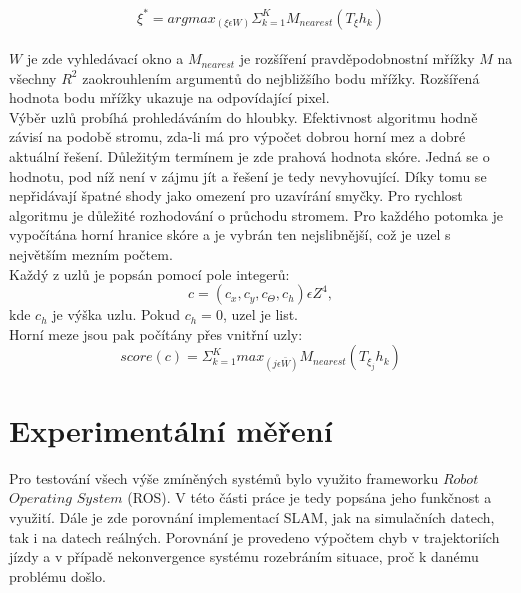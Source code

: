 \documentclass[12pt]{report}
\begin{document}
\begin{equation}
\xi^*=argmax_{(\xi\epsilon W)}\Sigma_{k=1}^KM_{nearest}(T_{\xi}h_k)
\end{equation}\\
$W$ je zde vyhledávací okno a $M_{nearest}$ je rozšíření pravděpodobnostní mřížky $M$ na všechny $R^2$ zaokrouhlením argumentů do nejbližšího bodu mřížky. Rozšířená hodnota bodu mřížky ukazuje na odpovídající pixel.\\
\indent Výběr uzlů probíhá prohledáváním do hloubky. Efektivnost algoritmu hodně závisí na podobě stromu, zda-li má pro výpočet dobrou horní mez a dobré aktuální řešení. Důležitým termínem je zde prahová hodnota skóre. Jedná se o hodnotu, pod níž není v zájmu jít a řešení je tedy nevyhovující. Díky tomu se nepřidávají špatné shody jako omezení pro uzavírání smyčky. Pro rychlost algoritmu je důležité rozhodování o průchodu stromem. Pro každého potomka je vypočítána horní hranice skóre a je vybrán ten nejslibnější, což je uzel s největším mezním počtem.\\
\indent Každý z uzlů je popsán pomocí pole integerů: 
\begin{equation}
c=(c_x,c_y,c_\Theta,c_h)\epsilon Z^4,
\end{equation}
kde $c_h$ je výška uzlu. Pokud $c_h=0$, uzel je list.\\
\indent Horní meze jsou pak počítány přes vnitřní uzly: 
\begin{equation}
score(c)=\Sigma_{k=1}^Kmax_{(j\epsilon \bar{W})}M_{nearest}(T_{\xi_j}h_k)
\end{equation}

\newpage

\chapter{Experimentální měření}
Pro testování všech výše zmíněných systémů bylo využito frameworku $Robot$ $Operating$ $System$ (ROS). V této části práce je tedy popsána jeho funkčnost a využití. Dále je zde porovnání implementací SLAM, jak na simulačních datech, tak i na datech reálných. Porovnání je provedeno výpočtem chyb v trajektoriích jízdy a v případě nekonvergence systému rozebráním situace, proč k danému problému došlo.
\end{document}
